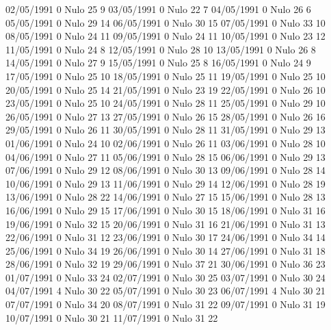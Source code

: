 02/05/1991  0     Nulo    25     9 
03/05/1991  0     Nulo    22     7 
04/05/1991  0     Nulo    26     6 
05/05/1991  0     Nulo    29     14 
06/05/1991  0     Nulo    30     15 
07/05/1991  0     Nulo    33     10 
08/05/1991  0     Nulo    24     11 
09/05/1991  0     Nulo    24     11 
10/05/1991  0     Nulo    23     12 
11/05/1991  0     Nulo    24     8 
12/05/1991  0     Nulo    28     10 
13/05/1991  0     Nulo    26     8 
14/05/1991  0     Nulo    27     9 
15/05/1991  0     Nulo    25     8 
16/05/1991  0     Nulo    24     9 
17/05/1991  0     Nulo    25     10 
18/05/1991  0     Nulo    25     11 
19/05/1991  0     Nulo    25     10 
20/05/1991  0     Nulo    25     14 
21/05/1991  0     Nulo    23     19 
22/05/1991  0     Nulo    26     10 
23/05/1991  0     Nulo    25     10 
24/05/1991  0     Nulo    28     11 
25/05/1991  0     Nulo    29     10 
26/05/1991  0     Nulo    27     13 
27/05/1991  0     Nulo    26     15 
28/05/1991  0     Nulo    26     16 
29/05/1991  0     Nulo    26     11 
30/05/1991  0     Nulo    28     11 
31/05/1991  0     Nulo    29     13 
01/06/1991  0     Nulo    24     10 
02/06/1991  0     Nulo    26     11 
03/06/1991  0     Nulo    28     10 
04/06/1991  0     Nulo    27     11 
05/06/1991  0     Nulo    28     15 
06/06/1991  0     Nulo    29     13 
07/06/1991  0     Nulo    29     12 
08/06/1991  0     Nulo    30     13 
09/06/1991  0     Nulo    28     14 
10/06/1991  0     Nulo    29     13 
11/06/1991  0     Nulo    29     14 
12/06/1991  0     Nulo    28     19 
13/06/1991  0     Nulo    28     22 
14/06/1991  0     Nulo    27     15 
15/06/1991  0     Nulo    28     13 
16/06/1991  0     Nulo    29     15 
17/06/1991  0     Nulo    30     15 
18/06/1991  0     Nulo    31     16 
19/06/1991  0     Nulo    32     15 
20/06/1991  0     Nulo    31     16 
21/06/1991  0     Nulo    31     13 
22/06/1991  0     Nulo    31     12 
23/06/1991  0     Nulo    30     17 
24/06/1991  0     Nulo    34     14 
25/06/1991  0     Nulo    34     19 
26/06/1991  0     Nulo    30     14 
27/06/1991  0     Nulo    31     18 
28/06/1991  0     Nulo    32     19 
29/06/1991  0     Nulo    37     21 
30/06/1991  0     Nulo    36     23 
01/07/1991  0     Nulo    33     24 
02/07/1991  0     Nulo    30     25 
03/07/1991  0     Nulo    30     24 
04/07/1991  4     Nulo    30     22 
05/07/1991  0     Nulo    30     23 
06/07/1991  4     Nulo    30     21 
07/07/1991  0     Nulo    34     20 
08/07/1991  0     Nulo    31     22 
09/07/1991  0     Nulo    31     19 
10/07/1991  0     Nulo    30     21 
11/07/1991  0     Nulo    31     22 

